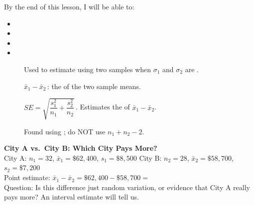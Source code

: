 \documentclass[10pt]{article}
\begin{document}
\namedateperiod

\vspace{0.15in}

\begin{objectivebox}
By the end of this lesson, I will be able to:
\begin{itemize}
  \item {}
  \item {}
  \item {}
  \item {}
\end{itemize}
\end{objectivebox}

\begin{vocabbox}
\begin{description}
  \item[]
        Used to estimate  using two  samples when
        $\sigma_1$ and $\sigma_2$ are .
  \item[]
        $\bar x_1 - \bar x_2$\,: the  of the two sample means.
  \item[]
        $SE = \sqrt{\dfrac{s_1^2}{n_1} + \dfrac{s_2^2}{n_2}}$\,. \quad
        Estimates the  of $\bar x_1 - \bar x_2$.
  \item[]
        Found using ; do NOT use $n_1 + n_2 - 2$.
\end{description}
\end{vocabbox}

\begin{hookbox}
\textbf{City A vs.\ City B: Which City Pays More?}\\
City A: $n_1 = 32$, $\bar x_1 = \$62{,}400$, $s_1 = \$8{,}500$ \quad
City B: $n_2 = 28$, $\bar x_2 = \$58{,}700$, $s_2 = \$7{,}200$\\[4pt]
Point estimate: $\bar x_1 - \bar x_2 = \$62{,}400 - \$58{,}700 = $ \\[4pt]
Question: Is this difference just random variation, or evidence that City A really pays more?
An interval estimate will tell us.
\end{hookbox}
\end{document}

